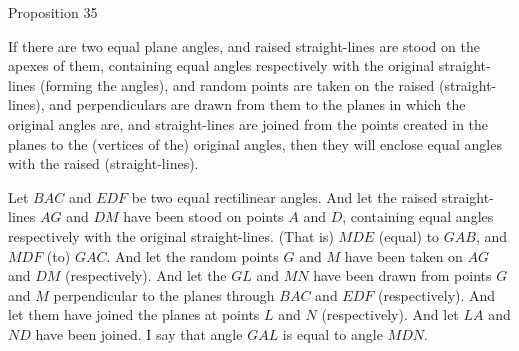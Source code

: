 \begin{center}
{\large Proposition 35}
\end{center}

If there are two equal plane angles, and
raised straight-lines are stood on the apexes of them, containing equal angles respectively
with the original straight-lines (forming the angles), and random points are taken on the raised
(straight-lines), and perpendiculars are drawn from them to the planes
in which the original angles are, and straight-lines are joined  from the
points created in the planes to the (vertices of the) original angles, then they will enclose
equal angles with the raised (straight-lines).

Let $BAC$ and $EDF$ be two equal rectilinear angles. And let the raised
straight-lines $AG$ and $DM$ have been stood  on points $A$ and $D$,
containing equal angles respectively with the original straight-lines. (That
is) $MDE$ (equal) to $GAB$, and $MDF$ (to) $GAC$. And let the random
points $G$ and $M$ have been taken on $AG$ and $DM$ (respectively). 
And let the  $GL$ and $MN$ have been drawn  from 
points $G$ and $M$ perpendicular to the planes through $BAC$ and $EDF$ (respectively).
And let them have joined the planes at points $L$ and $N$ (respectively).
And let $LA$ and $ND$ have been joined. I say that angle $GAL$ is
equal to angle $MDN$.

\epsfysize=2.4in
\centerline{}

